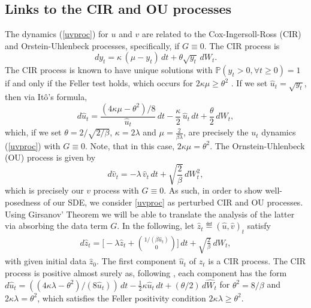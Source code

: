 \documentclass[11pt, twoside]{report}
\begin{document}
\subsection{Links to the CIR and OU processes}
The dynamics (\ref{uvproc}) for $u$ and $v$ are related to the Cox-Ingersoll-Ross (CIR) and Orstein-Uhlenbeck processes, specifically, if $G \equiv 0$. The CIR process is
\begin{equation}\label{eq:cir1}
    dy_t = \kappa\,(\mu-y_t) \,dt + \theta \sqrt{y_t} \,dW_t.
\end{equation}
The CIR process is known to have unique solutions with $\mathbb{P}(y_t > 0, \forall t \geq 0) = 1$ if and only if the Feller test holds, which occurs for $2\kappa \mu \geq \theta^2$ \cite{Gikhman2011}.  If we set $\hat{u}_t = \sqrt{y_t}$, then via It\^{o}'s formula,
\begin{equation}\label{eq:cir_2}
    d\hat u_t = \frac{(4\kappa \mu-\theta^2)/8}{\hat u_t}\,dt -\frac{\kappa}{2}\,\hat u_t \,dt + \frac{\theta}{2} \,dW_t,
\end{equation}
which, if we set $\theta = 2/\sqrt{2/\beta}$, $\kappa = 2\lambda$ and $\mu = \frac{2}{\beta \lambda}$, are precisely the $u_t$ dynamics (\ref{uvproc}) with $G \equiv 0$. Note, that in this case, $2\kappa \mu = \theta^2$. The Ornstein-Uhlenbeck (OU) process is given by
$$
d\hat v_t =-\lambda\, \hat v_t\, dt + \sqrt{\frac{2}{\beta}}\,dW_t^2,
$$
which is precisely our $v$ process with $G \equiv 0$. As such, in order to show well-posedness of our SDE, we consider \eqref{uvproc} as perturbed CIR and OU processes. Using Girsanov' Theorem we will be able to translate the analysis of the latter via absorbing the data term $G$. In the following, let $\hat z_t \eqdef (\hat u,\hat v)_t$ satisfy
\begin{align}\label{potential_free_sde_z}
d \hat z_t = \biggl[-\lambda \hat z_t + \binom{1/(\beta \hat u_t)}{0} \biggr]\,dt + \sqrt{\frac{2}{\beta}} \,d  W_t,
\end{align}
with given initial data $\hat z_0$. The first component $\hat u_t$ of $\hat z_t$ is a CIR process. The CIR process is positive almost surely as, following \cite{Dereich2011-tp}, each component has the form $d\hat u_t = ((4\kappa \lambda - \theta^2)/(8\hat u_t))\,dt - \frac12 \kappa \hat u_t\, dt + (\theta/2)\,d\hat W_t$ for $\theta^2 = 8/\beta$ and $2\kappa\lambda = \theta^2$, which satisfies the Feller positivity condition $2\kappa\lambda\geq \theta^2$.%
\end{document}
